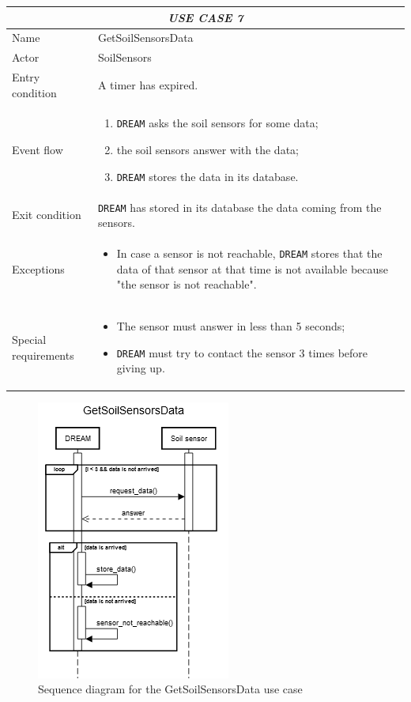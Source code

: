 \documentclass{article}
\begin{document}
\centering
\begin{longtable}{|p{3.5cm}|m{8cm}|}
 \hline
 \multicolumn{2}{|c|}{\cellcolor{white}\emph{USE CASE 7}} \\
 \endfirsthead
 \endhead
 \endfoot
 \endlastfoot
 \hline
 Name & GetSoilSensorsData\\
 \hline
 Actor & SoilSensors\\
 \hline
 Entry condition & A timer has expired.\\
 \hline
 Event flow & \begin{enumerate}
    \item \verb|DREAM| asks the soil sensors for some data;
    \item the soil sensors answer with the data;
    \item \verb|DREAM| stores the data in its database.
 \end{enumerate}\\
 \hline
 Exit condition & \verb|DREAM| has stored in its database the data coming from the sensors.\\
 \hline
 Exceptions & \begin{itemize}
     \item In case a sensor is not reachable, \verb|DREAM| stores that the data of that sensor at that time is not available because "the sensor is not reachable".
 \end{itemize}\\
 \hline
 Special requirements &\begin{itemize}
     \item The sensor must answer in less than 5 seconds;
     \item \verb|DREAM| must try to contact the sensor 3 times before giving up.
 \end{itemize}\\
 \hline
\end{longtable}
\begin{figure}[H]
    \centering
    \includegraphics[scale=0.75]{sequence_diagrams/GetSoilSensorsData}
    \caption{Sequence diagram for the GetSoilSensorsData use case}
\end{figure}
\end{document}
